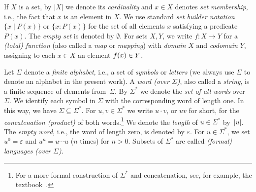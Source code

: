
If $X$
is a set, by $|X|$ we denote its \emph{cardinality}  and $x \in X$ denotes \emph{set membership}, i.e., the fact that $x$
is an element in $X$. 
We use standard \emph{set builder notation} $\{ x \mid P(x)\}$ 
or 
$\{ x : P(x)\}$ for the set of all elements $x$ satisfying a predicate $P(x)$.
The \emph{empty set} is denoted by $\emptyset$. 
For sets $X,Y$, we write $f \colon X \to Y$
for a \emph{(total) function} (also called a \emph{map} or \emph{mapping}) with \emph{domain} $X$ and 
\emph{codomain} $Y$, assigning to each $x \in X$ an element $\applyfunc{x}{f} \in Y$.
\label{def:emptyset}
\label{def:function-application}
\label{def:total_function}


\label{def:n-times-concat}
\label{def:Sigmastar}
\label{def:Sigma}
\label{def:length_of_word}
\label{def:empty-word} 
Let $\Sigma$ denote a \emph{finite alphabet}, i.e., a set of \emph{symbols} or \emph{letters} (we always use $\Sigma$ to denote an alphabet in the present work). 
A \emph{word (over $\Sigma$)}, also called a \emph{string}, is a finite sequence of elements from~$\Sigma$.
By $\Sigma^*$ we denote the \emph{set of all words} over $\Sigma$.
We identify each symbol in $\Sigma$ with the corresponding word of length one. In this way, we have $\Sigma \subseteq \Sigma^*$.
For $u,v \in \Sigma^*$ we write $u\cdot v$, or $uv$ for short, for the \emph{concatenation (product)} of both words.\footnote{For a more formal	construction of $\Sigma^*$ and concatenation, see, for example, the textbook~\cite[p.~5]{Eilenberg1974}.}
We denote the \emph{length} of $u \in \Sigma^*$ by~$|u|$. 
The \emph{empty word}, i.e., the word of length zero,  
is denoted by $\varepsilon$. For $u \in \Sigma^*$, we set $u^0 = \varepsilon$ and $u^n = u\cdots u$ ($n$ times) for $n > 0$. 
Subsets of $\Sigma^*$ are called \emph{(formal) languages (over $\Sigma$)}. 

